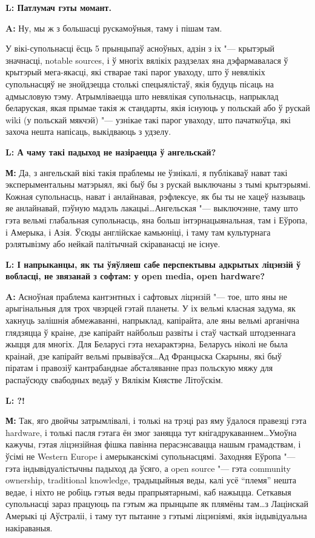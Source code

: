 \documentclass[10pt, a5paper]{article}
\begin{document}
{\noindent \bf L: Патлумач гэты момант.}

{\noindent \bf A:} Ну, мы ж з большасці рускамоўныя, таму і пішам там.

У вікі-супольнасці ёсць 5 прынцыпаў асноўных, адзін з іх "--- крытэрый значнасці, notable sources, і ў многіх вялікіх раздзелах яна дэфармавалася ў крытэрый мега-якасці, які стварае такі парог уваходу, што ў невялікіх супольнасцяў не знойдзецца столькі спецыялістаў, якія будуць пісаць на адмысловую тэму. Атрымліваецца што невялікая супольнасць, напрыклад беларуская, якая прымае такія ж стандарты, якія існуюць у польскай або ў рускай wіkі (у польскай мякчэй) "--- узнікае такі парог уваходу, што пачаткоўца, які захоча нешта напісаць, выкідваюць з удзелу.


{\noindent \bf L: А чаму такі падыход не назіраецца ў ангельскай?}

{\noindent \bf М:} Да, з ангельскай вікі такія праблемы не ўзнікалі, я публікаваў нават такі эксперыментальны матэрыял, які быў бы з рускай выключаны з тымі крытэрыямі. Кожная супольнасць, нават і анлайнавая, рэфлексуе, як бы ты не хацеў называць яе анлайнавай, пэўную мадэль лакацыі\ldots Ангельская "--- выключэнне, таму што гэта вельмі глабальная супольнасць, яна больш інтэрнацыянальная, там і Еўропа, і Амерыка, і Азія. Ўсюды англійскае камьюніці, і таму там культурнага рэлятывізму або нейкай палітычнай скіраванасці не існуе.
 
{\noindent \bf L: І напрыканцы, як ты ўяўляеш сабе перспектывы адкрытых ліцэнзій ў вобласці, не звязанай з софтам: у open media, open hardware?}

{\noindent \bf A:} Асноўная праблема кантэнтных і сафтовых ліцэнзій "--- тое, што яны не арыгінальныя для трох чвэрцей гэтай планеты. У іх вельмі класная задума, як хакнуць залішнія абмежаванні, напрыклад, капірайта, але яны вельмі арганічна глядзяцца ў краіне, дзе капірайт найбольш развіты і стаў часткай штодзеннага жыцця для многіх. Для Беларусі гэта нехарактэрна, Беларусь ніколі не была краінай, дзе капірайт вельмі прывіваўся\ldots Ад Францыска Скарыны, які быў піратам і правозіў кантрабанднае абсталяванне праз польскую мяжу для распаўсюду свабодных ведаў у Вялікім Княстве Літоўскім.


{\noindent \bf L: ?!}

{\noindent \bf М:} Так, яго двойчы затрымлівалі, і толькі на трэці раз яму ўдалося правезці гэта hardware, і толькі пасля гэтага ён змог заняцца тут кнігадрукаваннем\ldots Умоўна кажучы, гэтая ліцэнзійная фішка павінна перасэнсавацца нашым грамадствам, і ўсімі не Western Europe і амерыканскімі супольнасцямі. Заходняя Еўропа "--- гэта індывідуалістычны падыход да ўсяго, а open source "--- гэта communіty ownershіp, tradіtіonal knowledge, традыцыйныя веды, калі усё “племя” нешта ведае, і ніхто не робіць гэтыя веды прапрыятарнымі, каб нажыцца. Сеткавыя супольнасці зараз працуюць па гэтым жа прынцыпе як плямёны там\ldots з Лацінскай Амерыкі ці Аўстраліі, і таму тут пытанне з гэтымі ліцэнзіямі, якія індывідуальна накіраваныя.
\end{document}
